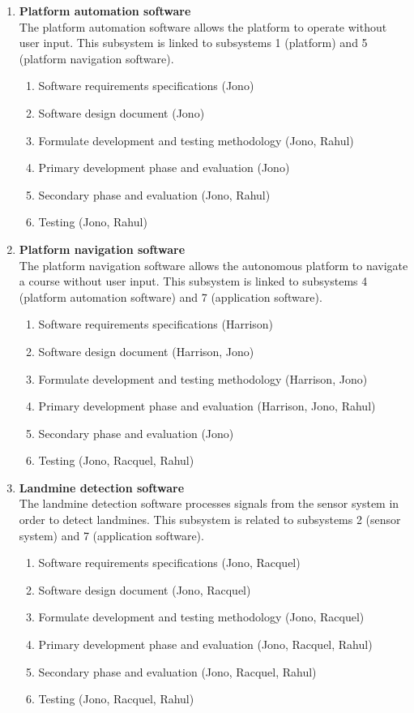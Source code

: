 \documentclass[main.tex]{subfiles}
\begin{document}
\begin{appendices}
{\begin{enumerate}
\item \textbf{Platform automation software}\\
The platform automation software allows the platform to operate without user input. This subsystem is linked to subsystems 1 (platform) and 5 (platform navigation software).
    \begin{enumerate}[label*=\arabic*.]
    \item Software requirements specifications (Jono)
    \item Software design document (Jono)
    \item Formulate development and testing methodology (Jono, Rahul)
    \item Primary development phase and evaluation (Jono)
    \item Secondary phase and evaluation (Jono, Rahul)
    \item Testing (Jono, Rahul)
    \end{enumerate}
    
\item \textbf{Platform navigation software}\\
The platform navigation software allows the autonomous platform to navigate a course without user input. This subsystem is linked to subsystems 4 (platform automation software) and 7 (application software). 
    \begin{enumerate}[label*=\arabic*.]
    \item Software requirements specifications (Harrison)
    \item Software design document (Harrison, Jono)
    \item Formulate development and testing methodology (Harrison, Jono)
    \item Primary development phase and evaluation (Harrison, Jono, Rahul)
    \item Secondary phase and evaluation (Jono)
    \item Testing (Jono, Racquel, Rahul)
    \end{enumerate}
    
\item \textbf{Landmine detection software}\\
The landmine detection software processes signals from the sensor system in order to detect landmines. This subsystem is related to subsystems 2 (sensor system) and 7 (application software).
    \begin{enumerate}[label*=\arabic*.]
    \item Software requirements specifications (Jono, Racquel)
    \item Software design document (Jono, Racquel)
    \item Formulate development and testing methodology (Jono, Racquel)
    \item Primary development phase and evaluation (Jono, Racquel, Rahul)
    \item Secondary phase and evaluation (Jono, Racquel, Rahul)
    \item Testing (Jono, Racquel, Rahul)
    \end{enumerate}
    

\end{enumerate}}
\end{appendices}
\end{document}
